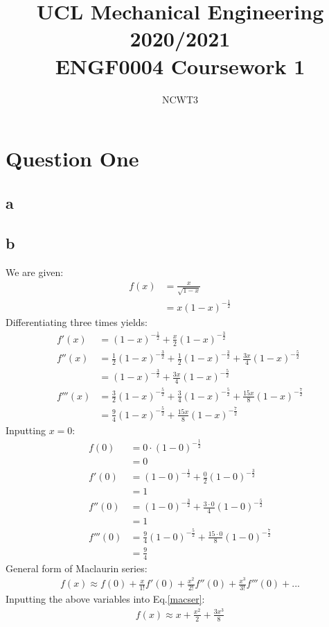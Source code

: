 \documentclass[11pt]{article}
\numberwithin{equation}{section}
\begin{document}
\title{\textbf{UCL Mechanical Engineering 2020/2021}\\ENGF0004 Coursework 1}
\author{NCWT3}
\maketitle
\section{Question One}
\subsection*{a}
\subsection*{b}
We are given:
\begin{align}
	f(x) &= \frac{x}{\sqrt{1-x}}\\
	&= x\left( 1 - x \right)^{-\frac{1}{2}}
\end{align}
Differentiating three times yields:
\begin{align}
	f'(x) &= \left(1 - x \right)^{-\frac{1}{2}} + \frac{x}{2} \left( 1-x\right)^{-\frac{3}{2}}\\
	f''(x) &= \frac{1}{2} \left( 1- x\right)^{-\frac{3}{2}} + \frac{1}{2} \left( 1- x\right)^{-\frac{3}{2}} + \frac{3x}{4} \left( 1-x \right)^{-\frac{5}{2}}\\
	&= \left( 1-x \right)^{-\frac{3}{2}} + \frac{3x}{4} \left( 1-x \right)^{-\frac{5}{2}} \\
	f'''(x) &= \frac{3}{2} \left( 1-x \right)^{-\frac{5}{2}} + \frac{3}{4} \left( 1-x \right)^{-\frac{5}{2}} + \frac{15x}{8} \left( 1-x \right)^{-\frac{7}{2}}\\
	&= \frac{9}{4} \left( 1-x \right)^{-\frac{5}{2}} + \frac{15x}{8} \left( 1-x \right)^{-\frac{7}{2}}
\end{align}
Inputting $x=0$:
\begin{align}
	f(0) &= 0 \cdot \left( 1 - 0 \right)^{-\frac{1}{2}}\\
	&= 0\\
	f'(0) &= \left(1 - 0 \right)^{-\frac{1}{2}} + \frac{0}{2} \left( 1-0\right)^{-\frac{3}{2}}\\
	&= 1\\
	f''(0) &= \left( 1-0 \right)^{-\frac{3}{2}} + \frac{3\cdot 0}{4} \left( 1-0 \right)^{-\frac{5}{2}}\\
	&= 1\\
	f'''(0) &= \frac{9}{4} \left( 1-0 \right)^{-\frac{5}{2}} + \frac{15 \cdot 0}{8} \left( 1-0 \right)^{-\frac{7}{2}}\\
	&= \frac{9}{4}
\end{align}
General form of Maclaurin series:
\begin{align}
	f(x) \approx f(0) + \frac{x}{1!}f'(0) + \frac{x^2}{2!}f''(0) + \frac{x^3}{3!}f'''(0) + ... \label{macser}
\end{align}
Inputting the above variables into Eq.\ref{macser}:
\begin{align}
	f(x) \approx x + \frac{x^2}{2} + \frac{3x^3}{8}	
\end{align}
\end{document}

